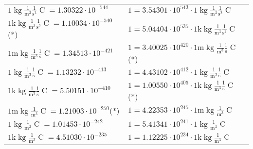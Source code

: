 \begin{center}
\begin{longtable}{l l}
{\color{black}$1 \bm{\mathrm{ }}\operatorname{kg}\frac1{\operatorname{m}^3}\frac1{\operatorname{s}^2}{\operatorname{C}}{} = 1.30322\cdot10^{-544} $}   & {\color{black}$ 1 = 3.54301\cdot10^{543} \cdot 1 \bm{\mathrm{ }}\operatorname{kg}\frac1{\operatorname{m}^3}\frac1{\operatorname{s}^2}{\operatorname{C}}{}$}  \\
{\color{gray}$1 \bm{\mathrm{ k}}\operatorname{kg}\frac1{\operatorname{m}^3}\frac1{\operatorname{s}^2}{\operatorname{C}}{} = 1.10034\cdot10^{-540} $}\quad(*) & {\color{gray}$ 1 = 5.04404\cdot10^{535} \cdot 1 \bm{\mathrm{ k}}\operatorname{kg}\frac1{\operatorname{m}^3}\frac1{\operatorname{s}^2}{\operatorname{C}}{}$}  \\
{\color{gray}$1 \bm{\mathrm{ m}}\operatorname{kg}\frac1{\operatorname{m}^3}\frac1{\operatorname{s}}{\operatorname{C}}{} = 1.34513\cdot10^{-421} $}   & {\color{gray}$ 1 = 3.40025\cdot10^{420} \cdot 1 \bm{\mathrm{ m}}\operatorname{kg}\frac1{\operatorname{m}^3}\frac1{\operatorname{s}}{\operatorname{C}}{}$}\quad(*)\\
{\color{black}$1 \bm{\mathrm{ }}\operatorname{kg}\frac1{\operatorname{m}^3}\frac1{\operatorname{s}}{\operatorname{C}}{} = 1.13232\cdot10^{-413} $}   & {\color{black}$ 1 = 4.43102\cdot10^{412} \cdot 1 \bm{\mathrm{ }}\operatorname{kg}\frac1{\operatorname{m}^3}\frac1{\operatorname{s}}{\operatorname{C}}{}$}  \\
{\color{gray}$1 \bm{\mathrm{ k}}\operatorname{kg}\frac1{\operatorname{m}^3}\frac1{\operatorname{s}}{\operatorname{C}}{} = 5.50151\cdot10^{-410} $}   & {\color{gray}$ 1 = 1.00550\cdot10^{405} \cdot 1 \bm{\mathrm{ k}}\operatorname{kg}\frac1{\operatorname{m}^3}\frac1{\operatorname{s}}{\operatorname{C}}{}$}\quad(*)\\
{\color{gray}$1 \bm{\mathrm{ m}}\operatorname{kg}\frac1{\operatorname{m}^3}{}{\operatorname{C}}{} = 1.21003\cdot10^{-250} $}\quad(*) & {\color{gray}$ 1 = 4.22353\cdot10^{245} \cdot 1 \bm{\mathrm{ m}}\operatorname{kg}\frac1{\operatorname{m}^3}{}{\operatorname{C}}{}$}  \\
{\color{black}$1 \bm{\mathrm{ }}\operatorname{kg}\frac1{\operatorname{m}^3}{}{\operatorname{C}}{} = 1.01453\cdot10^{-242} $}   & {\color{black}$ 1 = 5.41341\cdot10^{241} \cdot 1 \bm{\mathrm{ }}\operatorname{kg}\frac1{\operatorname{m}^3}{}{\operatorname{C}}{}$}  \\
{\color{gray}$1 \bm{\mathrm{ k}}\operatorname{kg}\frac1{\operatorname{m}^3}{}{\operatorname{C}}{} = 4.51030\cdot10^{-235} $}   & {\color{gray}$ 1 = 1.12225\cdot10^{234} \cdot 1 \bm{\mathrm{ k}}\operatorname{kg}\frac1{\operatorname{m}^3}{}{\operatorname{C}}{}$}  \\

\end{longtable}
\end{center}
